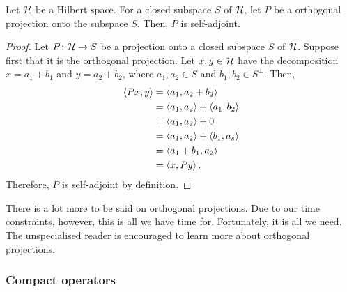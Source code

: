 \begin{proposition}
  Let $\mathcal{H}$ be a Hilbert space. For a closed subspace $S$ of $\mathcal{H}$, let $P$ be a orthogonal projection onto the subspace $S$. Then, $P$ is self-adjoint.
\end{proposition}
\begin{proof}
  Let $P \colon \mathcal{H} \to S$ be a projection onto a closed subspace $S$ of $\mathcal{H}$. Suppose first that it is the orthogonal projection. Let $x, y \in \mathcal{H}$ have the decomposition $x = a_1 + b_1$ and $y = a_2 + b_2$, where $a_1, a_2 \in S$ and $b_1, b_2 \in S^{\perp}$. Then,
  \begin{align*}
    \left\langle Px, y\right\rangle
    &=
    \left\langle a_1, a_2 + b_2\right\rangle \\
    &=
    \left\langle a_1, a_2\right\rangle + \left\langle a_1, b_2\right\rangle \\
    &=
    \left\langle a_1, a_2\right\rangle + 0 \\
    &=
    \left\langle a_1, a_2\right\rangle + \left\langle b_1, a_s\right\rangle \\
    &=
    \left\langle a_1 + b_1, a_2\right\rangle \\
    &=
    \left\langle x, Py\right\rangle.
  \end{align*}
  Therefore, $P$ is self-adjoint by definition.
\end{proof}
There is a lot more to be said on orthogonal projections. Due to our time constraints, however, this is all we have time for. Fortunately, it is all we need. The unspecialised reader is encouraged to learn more about orthogonal projections.

\subsubsection{Compact operators}

%

